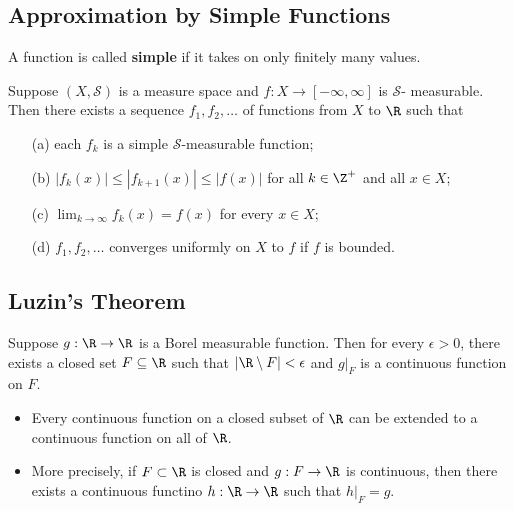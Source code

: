 \subsection{Approximation by Simple Functions}

\begin{definition}
    A function is called \textbf{simple} if it takes on only finitely many values.
\end{definition}

\begin{prop}
    Suppose \( (X,\mathcal{S}) \) is a measure space and \( f: X \to [-\infty ,\infty ] \) is \( \mathcal{S} \)- measurable. Then there exists a sequence \( {f}_{1}, {f}_{2}, \dots  \) of functions from \( X  \) to \( \R  \) such that 
    \begin{enumerate}
        \item[(a)] each \( {f}_{k} \) is a simple \( \mathcal{S} \)-measurable function;
        \item[(b)] \( | {f}_{k}(x) |  \leq | {f}_{k+1}(x) |  \leq | f(x) |  \) for all \( k \in \Z^{+} \) and all \( x \in X  \);
        \item[(c)] \( \lim_{ k  \to  \infty  }  {f}_{k }(x) = f(x)  \) for every \( x \in X  \);
        \item[(d)] \( {f}_{1}, {f}_{2}, \dots  \) converges uniformly on \( X  \) to \( f  \) if \( f  \) is bounded.
    \end{enumerate}
\end{prop}

\subsection{Luzin's Theorem}

\begin{prop}
    Suppose \( g: \R \to \R  \) is a Borel measurable function. Then for every \( \epsilon > 0  \), there exists a closed set \( F \subseteq  \R   \) such that \( | \R \setminus  F   |  < \epsilon \) and \( g |_{F} \) is a continuous function on \( F  \). 
\end{prop}

\begin{prop}
    \begin{itemize}
        \item Every continuous function on a closed subset of \( \R  \) can be extended to a continuous function on all of \( \R  \).
        \item More precisely, if \( F \subset \R  \) is closed and \( g : F \to \R  \) is continuous, then there exists a continuous functino \( h: \R \to \R  \) such that \( h |_{F} = g \). 
    \end{itemize}
\end{prop}

